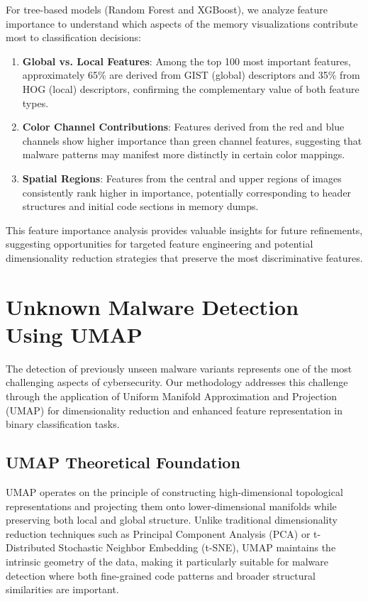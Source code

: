 For tree-based models (Random Forest and XGBoost), we analyze feature importance to understand which aspects of the memory visualizations contribute most to classification decisions:

\begin{enumerate}
    \item \textbf{Global vs. Local Features}: Among the top 100 most important features, approximately 65\% are derived from GIST (global) descriptors and 35\% from HOG (local) descriptors, confirming the complementary value of both feature types.
    
    \item \textbf{Color Channel Contributions}: Features derived from the red and blue channels show higher importance than green channel features, suggesting that malware patterns may manifest more distinctly in certain color mappings.
    
    \item \textbf{Spatial Regions}: Features from the central and upper regions of images consistently rank higher in importance, potentially corresponding to header structures and initial code sections in memory dumps.
\end{enumerate}

This feature importance analysis provides valuable insights for future refinements, suggesting opportunities for targeted feature engineering and potential dimensionality reduction strategies that preserve the most discriminative features.

\section{Unknown Malware Detection Using UMAP}
\label{sec:umap-detection}

The detection of previously unseen malware variants represents one of the most challenging aspects of cybersecurity. Our methodology addresses this challenge through the application of Uniform Manifold Approximation and Projection (UMAP) for dimensionality reduction and enhanced feature representation in binary classification tasks.

\subsection{UMAP Theoretical Foundation}
\label{subsec:umap-theory}

UMAP operates on the principle of constructing high-dimensional topological representations and projecting them onto lower-dimensional manifolds while preserving both local and global structure. Unlike traditional dimensionality reduction techniques such as Principal Component Analysis (PCA) or t-Distributed Stochastic Neighbor Embedding (t-SNE), UMAP maintains the intrinsic geometry of the data, making it particularly suitable for malware detection where both fine-grained code patterns and broader structural similarities are important.

